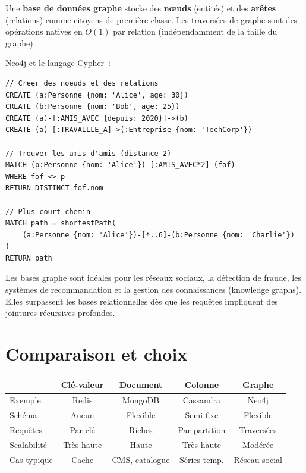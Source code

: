\begin{definition}
Une \textbf{base de donn\'ees graphe} stocke des \textbf{n\oe uds}
(entit\'es) et des \textbf{ar\^etes} (relations) comme citoyens de
premi\`ere classe. Les travers\'ees de graphe sont des op\'erations natives
en $O(1)$ par relation (ind\'ependamment de la taille du graphe).
\end{definition}

\begin{exemple}
Neo4j et le langage Cypher~:
\begin{verbatim}
// Creer des noeuds et des relations
CREATE (a:Personne {nom: 'Alice', age: 30})
CREATE (b:Personne {nom: 'Bob', age: 25})
CREATE (a)-[:AMIS_AVEC {depuis: 2020}]->(b)
CREATE (a)-[:TRAVAILLE_A]->(:Entreprise {nom: 'TechCorp'})

// Trouver les amis d'amis (distance 2)
MATCH (p:Personne {nom: 'Alice'})-[:AMIS_AVEC*2]-(fof)
WHERE fof <> p
RETURN DISTINCT fof.nom

// Plus court chemin
MATCH path = shortestPath(
    (a:Personne {nom: 'Alice'})-[*..6]-(b:Personne {nom: 'Charlie'})
)
RETURN path
\end{verbatim}
\end{exemple}

\begin{remarque}
Les bases graphe sont id\'eales pour les r\'eseaux sociaux, la d\'etection
de fraude, les syst\`emes de recommandation et la gestion des connaissances
(knowledge graphs). Elles surpassent les bases relationnelles d\`es que les
requ\^etes impliquent des jointures r\'ecursives profondes.
\end{remarque}

\section{Comparaison et choix}

\begin{center}
\begin{tabular}{lcccc}
\hline
& \textbf{Cl\'e-valeur} & \textbf{Document} & \textbf{Colonne} & \textbf{Graphe} \\
\hline
Exemple    & Redis    & MongoDB    & Cassandra & Neo4j \\
Sch\'ema   & Aucun    & Flexible   & Semi-fixe & Flexible \\
Requ\^etes & Par cl\'e & Riches     & Par partition & Travers\'ees \\
Scalabilit\'e & Tr\`es haute & Haute & Tr\`es haute & Mod\'er\'ee \\
Cas typique & Cache & CMS, catalogue & S\'eries temp. & R\'eseau social \\
\hline
\end{tabular}
\end{center}


